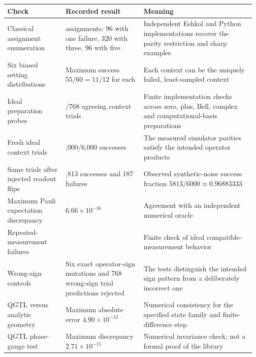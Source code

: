 \documentclass[10pt,a4paper]{article}
\begin{document}
{\def\LTcaptype{none} %
\begin{longtable}[]{@{}
  >{\raggedright\arraybackslash}p{}
  >{\raggedleft\arraybackslash}p{}
  >{\raggedright\arraybackslash}p{}@{}}
\toprule\noalign{}
\begin{minipage}[b]{\linewidth}\raggedright
Check
\end{minipage} & \begin{minipage}[b]{\linewidth}\raggedleft
Recorded result
\end{minipage} & \begin{minipage}[b]{\linewidth}\raggedright
Meaning
\end{minipage} \\
\midrule\noalign{}
\endhead
\bottomrule\noalign{}
\endlastfoot
Classical assignment enumeration & 512 assignments; 96 with one failure,
320 with three, 96 with five & Independent Eshkol and Python
implementations recover the parity restriction and sharp examples \\
Six biased setting distributions & Maximum success \(55/60=11/12\) for
each & Each context can be the uniquely failed, least-sampled context \\
Ideal preparation probes & 768/768 agreeing context trials & Finite
implementation checks across zero, plus, Bell, complex and
computational-basis preparations \\
Fresh ideal context trials & 6,000/6,000 successes & The measured
simulator parities satisfy the intended operator products \\
Same trials after injected readout flips & 5,813 successes and 187
failures & Observed synthetic-noise success fraction
\(5813/6000\approx0.96883333\) \\
Maximum Pauli expectation discrepancy & \(6.66\times10^{-16}\) &
Agreement with an independent numerical oracle \\
Repeated-measurement failures & 0 & Finite check of ideal
compatible-measurement behavior \\
Wrong-sign controls & Six exact operator-sign mutations and 768
wrong-sign trial predictions rejected & The tests distinguish the
intended sign pattern from a deliberately incorrect one \\
QGTL versus analytic geometry & Maximum absolute error
\(4.90\times10^{-12}\) & Numerical consistency for the specified state
family and finite-difference step \\
QGTL phase-gauge test & Maximum discrepancy \(2.71\times10^{-15}\) &
Numerical invariance check; not a formal proof of the library \\
\end{longtable}
}
\end{document}
